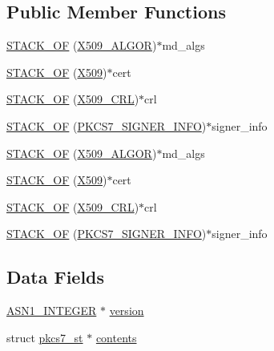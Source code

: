 \subsection*{Public Member Functions}
\begin{DoxyCompactItemize}
\item 
\hyperlink{structpkcs7__signed__st_a41ca2fd6d039aa248a7819d161b711fd}{S\+T\+A\+C\+K\+\_\+\+OF} (\hyperlink{crypto_2ossl__typ_8h_aa2b6185e6254f36f709cd6577fb5022e}{X509\+\_\+\+A\+L\+G\+OR})$\ast$md\+\_\+algs
\item 
\hyperlink{structpkcs7__signed__st_aca1d7c3b6b2fd28f65e72cae8f033c1f}{S\+T\+A\+C\+K\+\_\+\+OF} (\hyperlink{crypto_2ossl__typ_8h_a4f666bde6518f95deb3050c54b408416}{X509})$\ast$cert
\item 
\hyperlink{structpkcs7__signed__st_a389064605c76fdf049439a809e1af73b}{S\+T\+A\+C\+K\+\_\+\+OF} (\hyperlink{crypto_2ossl__typ_8h_ac8661d2485c2c8da5fd7dd26b846f4bf}{X509\+\_\+\+C\+RL})$\ast$crl
\item 
\hyperlink{structpkcs7__signed__st_a2ada878a13c6cf8f228678cd52c7132e}{S\+T\+A\+C\+K\+\_\+\+OF} (\hyperlink{crypto_2pkcs7_2pkcs7_8h_a827824ab5bc7870ffbc5213959710815}{P\+K\+C\+S7\+\_\+\+S\+I\+G\+N\+E\+R\+\_\+\+I\+N\+FO})$\ast$signer\+\_\+info
\item 
\hyperlink{structpkcs7__signed__st_a41ca2fd6d039aa248a7819d161b711fd}{S\+T\+A\+C\+K\+\_\+\+OF} (\hyperlink{crypto_2ossl__typ_8h_aa2b6185e6254f36f709cd6577fb5022e}{X509\+\_\+\+A\+L\+G\+OR})$\ast$md\+\_\+algs
\item 
\hyperlink{structpkcs7__signed__st_aca1d7c3b6b2fd28f65e72cae8f033c1f}{S\+T\+A\+C\+K\+\_\+\+OF} (\hyperlink{crypto_2ossl__typ_8h_a4f666bde6518f95deb3050c54b408416}{X509})$\ast$cert
\item 
\hyperlink{structpkcs7__signed__st_a389064605c76fdf049439a809e1af73b}{S\+T\+A\+C\+K\+\_\+\+OF} (\hyperlink{crypto_2ossl__typ_8h_ac8661d2485c2c8da5fd7dd26b846f4bf}{X509\+\_\+\+C\+RL})$\ast$crl
\item 
\hyperlink{structpkcs7__signed__st_a2ada878a13c6cf8f228678cd52c7132e}{S\+T\+A\+C\+K\+\_\+\+OF} (\hyperlink{crypto_2pkcs7_2pkcs7_8h_a827824ab5bc7870ffbc5213959710815}{P\+K\+C\+S7\+\_\+\+S\+I\+G\+N\+E\+R\+\_\+\+I\+N\+FO})$\ast$signer\+\_\+info
\end{DoxyCompactItemize}
\subsection*{Data Fields}
\begin{DoxyCompactItemize}
\item 
\hyperlink{crypto_2ossl__typ_8h_af4335399bf9774cb410a5e93de65998b}{A\+S\+N1\+\_\+\+I\+N\+T\+E\+G\+ER} $\ast$ \hyperlink{structpkcs7__signed__st_abf367aeef355b6acf5be7c569c4b28b0}{version}
\item 
struct \hyperlink{structpkcs7__st}{pkcs7\+\_\+st} $\ast$ \hyperlink{structpkcs7__signed__st_aeef95972194d66973936592656c73700}{contents}
\end{DoxyCompactItemize}


